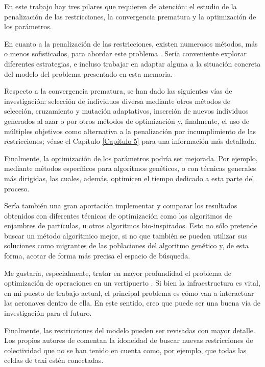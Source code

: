 \documentclass[12pt,a4paper]{book}
\begin{document}
En este trabajo hay tres pilares que requieren de atención: el estudio de la penalización de las restricciones, la convergencia prematura y la optimización de los parámetros. 

En cuanto a la penalización de las restricciones, existen numerosos métodos, más o menos sofisticados, para abordar este problema \cite{yu_introduction_2010}. Sería conveniente explorar diferentes estrategias, e incluso trabajar en adaptar alguna a la situación concreta del modelo del problema presentado en esta memoria. 

Respecto a la convergencia prematura, se han dado las siguientes vías de investigación: selección de individuos diversa mediante otros métodos de selección, cruzamiento y mutación adaptativos, inserción de nuevos individuos generados al azar o por otros métodos de optimización y, finalmente, el uso de múltiples objetivos como alternativa a la penalización por incumplimiento de las restricciones; véase el Capítulo \ref{Capítulo 5} para una información más detallada.

Finalmente, la optimización de los parámetros podría ser mejorada. Por ejemplo, mediante métodos específicos para algoritmos genéticos, o con técnicas generales más dirigidas, las cuales, además, optimicen el tiempo dedicado a esta parte del proceso. 


Sería también una gran aportación implementar y comparar los resultados obtenidos con diferentes técnicas de optimización como los algoritmos de enjambres de partículas, u otros algoritmos bio-inspirados. Esto no sólo pretende buscar un método algorítmico mejor, si no que también se pueden utilizar sus soluciones como migrantes de las poblaciones del algoritmo genético y, de esta forma, acotar de forma más precisa el espacio de búsqueda.  

Me gustaría, especialmente, tratar en mayor profundidad el problema de optimización de operaciones en un vertipuerto \cite{espejo-diaz_heuristic_2023}. Si bien la infraestructura es vital, en mi puesto de trabajo actual, el principal problema es cómo van a interactuar las aeronaves dentro de ella. En este sentido, creo que puede ser una buena vía de investigación para el futuro. 

Finalmente, las restricciones del modelo pueden ser revisadas con mayor detalle. Los propios autores de \cite{park_vertiport_2022} comentan la idoneidad de buscar nuevas restricciones de colectividad que no se han tenido en cuenta como, por ejemplo, que todas las celdas de taxi estén conectadas.
\end{document}
